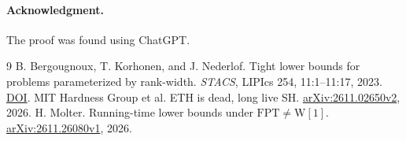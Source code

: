 \documentclass[11pt]{article}
\begin{document}
\paragraph{Acknowledgment.}
The proof was found using ChatGPT.

\begin{thebibliography}{9}
B. Bergougnoux, T. Korhonen, and J. Nederlof.
Tight lower bounds for problems parameterized by rank-width.
\emph{STACS}, LIPIcs 254, 11:1--11:17, 2023.
\href{https://doi.org/10.4230/LIPIcs.STACS.2023.11}{DOI}.
MIT Hardness Group et al. ETH is dead, long live SH.
\href{https://arxiv.org/abs/2611.02650v2}{arXiv:2611.02650v2}, 2026.
H. Molter. Running-time lower bounds under \(\mathrm{FPT}\ne\mathrm W[1]\).
\href{https://arxiv.org/abs/2611.26080v1}{arXiv:2611.26080v1}, 2026.
\end{thebibliography}
\end{document}

